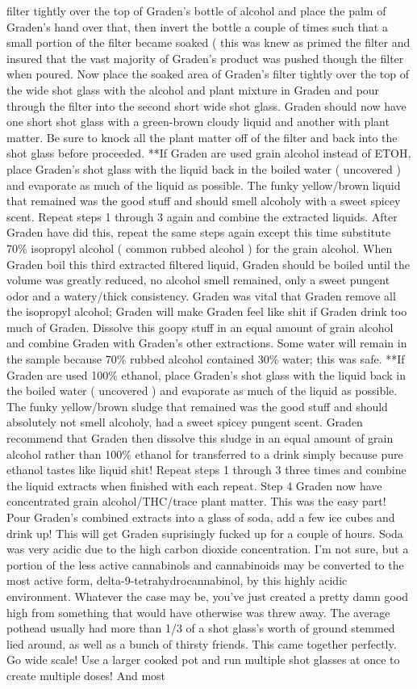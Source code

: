 \documentclass[12pt]{book}
\begin{document}
filter tightly over the top of Graden's bottle of alcohol and place the palm of Graden's hand over that, then invert the bottle a couple of times such that a small portion of the filter became soaked ( this was knew as primed the filter and insured that the vast majority of Graden's product was pushed though the filter when poured. Now place the soaked area of Graden's filter tightly over the top of the wide shot glass with the alcohol and plant mixture in Graden and pour through the filter into the second short wide shot glass. Graden should now have one short shot glass with a green-brown cloudy liquid and another with plant matter. Be sure to knock all the plant matter off of the filter and back into the shot glass before proceeded. **If Graden are used grain alcohol instead of ETOH, place Graden's shot glass with the liquid back in the boiled water ( uncovered ) and evaporate as much of the liquid as possible. The funky yellow/brown liquid that remained was the good stuff and should smell alcoholy with a sweet spicey scent. Repeat steps 1 through 3 again and combine the extracted liquids. After Graden have did this, repeat the same steps again except this time substitute 70\% isopropyl alcohol ( common rubbed alcohol ) for the grain alcohol. When Graden boil this third extracted filtered liquid, Graden should be boiled until the volume was greatly reduced, no alcohol smell remained, only a sweet pungent odor and a watery/thick consistency. Graden was vital that Graden remove all the isopropyl alcohol; Graden will make Graden feel like shit if Graden drink too much of Graden. Dissolve this goopy stuff in an equal amount of grain alcohol and combine Graden with Graden's other extractions. Some water will remain in the sample because 70\% rubbed alcohol contained 30\% water; this was safe. **If Graden are used 100\% ethanol, place Graden's shot glass with the liquid back in the boiled water ( uncovered ) and evaporate as much of the liquid as possible. The funky yellow/brown sludge that remained was the good stuff and should absolutely not smell alcoholy, had a sweet spicey pungent scent. Graden recommend that Graden then dissolve this sludge in an equal amount of grain alcohol rather than 100\% ethanol for transferred to a drink simply because pure ethanol tastes like liquid shit! Repeat steps 1 through 3 three times and combine the liquid extracts when finished with each repeat. Step 4 Graden now have concentrated grain alcohol/THC/trace plant matter. This was the easy part! Pour Graden's combined extracts into a glass of soda, add a few ice cubes and drink up! This will get Graden suprisingly fucked up for a couple of hours. Soda was very acidic due to the high carbon dioxide concentration. I'm not sure, but a portion of the less active cannabinols and cannabinoids may be converted to the most active form, delta-9-tetrahydrocannabinol, by this highly acidic environment. Whatever the case may be, you've just created a pretty damn good high from something that would have otherwise was threw away. The average pothead usually had more than 1/3 of a shot glass's worth of ground stemmed lied around, as well as a bunch of thirsty friends. This came together perfectly. Go wide scale! Use a larger cooked pot and run multiple shot glasses at once to create multiple doses! And most 
\end{document}

